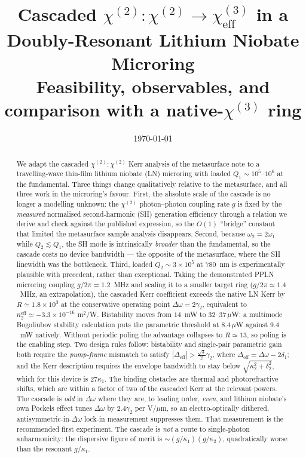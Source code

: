 \documentclass[11pt,a4paper]{article}
\newcommand{\Dom}{\Delta\omega}
\begin{document}
\title{Cascaded \texorpdfstring{$\chi^{(2)}{:}\chi^{(2)}\to\chi^{(3)}_{\text{eff}}$}{chi2:chi2 -> chi3eff}
       in a Doubly-Resonant Lithium Niobate Microring\\[4pt]
       \large Feasibility, observables, and comparison with a native-\texorpdfstring{$\chi^{(3)}$}{chi3} ring}
\author{}
\date{\today}
\maketitle

\begin{abstract}
\noindent
We adapt the cascaded $\chi^{(2)}{:}\chi^{(2)}$ Kerr analysis of the
metasurface note to a travelling-wave thin-film lithium niobate (LN)
microring with loaded $Q_1\sim10^5$--$10^6$ at the fundamental.  Three
things change qualitatively relative to the metasurface, and all three
work in the microring's favour.  First, the absolute scale of the
cascade is no longer a modelling unknown: the $\chi^{(2)}$
photon--photon coupling rate $g$ is fixed by the \emph{measured}
normalised second-harmonic (SH) generation efficiency through a relation
we derive and check against the published expression, so the
$O(1)$ ``bridge'' constant that limited the metasurface sample analysis
disappears.  Second, because $\omega_2=2\omega_1$ while $Q_2\lesssim Q_1$,
the SH mode is intrinsically \emph{broader} than the fundamental, so the
cascade costs no device bandwidth --- the opposite of the metasurface,
where the SH linewidth was the bottleneck.  Third, loaded $Q_2\sim3\times10^5$ at
$780$~nm is experimentally plausible with precedent, rather than
exceptional.  Taking the demonstrated PPLN microring coupling
$g/2\pi=1.2$~MHz and scaling it to a smaller target ring
($g/2\pi\simeq1.4$~MHz, an extrapolation), the cascaded Kerr coefficient
exceeds the native LN Kerr by $R\simeq1.8\times10^{3}$ at the
conservative operating point $\Dom=2\gamma_2$, equivalent to
$n_2^{\text{eff}}\simeq-3.3\times10^{-16}$ m$^2$/W.  Bistability moves
from $14$~mW to $32$--$37\,\mu$W; a multimode Bogoliubov stability
calculation puts the parametric threshold at $8.4\,\mu$W against
$9.4$~mW natively.  Without periodic poling the advantage collapses to
$R\simeq13$, so poling is the enabling step.  Two design rules follow:
bistability and single-pair parametric gain both require the
\emph{pump-frame} mismatch to satisfy
$|\Delta_{\text{eff}}|>\tfrac{\sqrt3}{2}\gamma_2$, where
$\Delta_{\text{eff}}=\Dom-2\delta_1$; and the Kerr description requires
the envelope bandwidth to stay below $\sqrt{\kappa_2^2+\delta_2^2}$,
which for this device is $27\kappa_1$.  The binding obstacles are
thermal and photorefractive shifts, which are within a factor of two of
the cascaded Kerr at the relevant powers.  The cascade is \emph{odd} in
$\Dom$ where they are, to leading order, \emph{even}, and lithium
niobate's own Pockels effect tunes $\Dom$ by $2.4\gamma_2$ per
V/$\mu$m, so an electro-optically dithered, antisymmetric-in-$\Dom$
lock-in measurement suppresses them.  That measurement is the
recommended first experiment.  The cascade is \emph{not} a route to
single-photon anharmonicity: the dispersive figure of merit is
$\sim(g/\kappa_1)(g/\kappa_2)$, quadratically worse than the resonant
$g/\kappa_1$.
\end{abstract}
\end{document}
